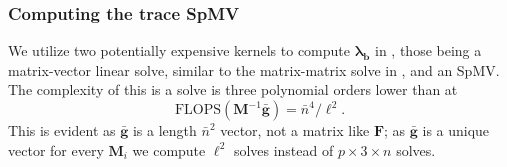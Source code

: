 
%		



%
%
%
\subsubsection{Computing the trace SpMV}

%
%
%
We utilize two potentially expensive kernels to compute $\symbf{\lambda}_{\textbf{b}}$ in , those being a matrix-vector linear solve, similar to the matrix-matrix solve in , and an SpMV. 
The complexity of this is a solve is three polynomial orders lower than  at
\begin{equation}
	\text{FLOPS}(\textbf{M}^{-1}\bar{\textbf{g}}) = \bar{n}^4/\ell^2.
\end{equation}
\noindent
This is evident as $\bar{\textbf{g}}$ is a length $\bar{n}^2$ vector, not a matrix like $\textbf{F}$; as $\bar{\textbf{g}}$ is a unique vector for every $\textbf{M}_i$ we compute $\ell^2$ solves instead of $p \times 3 \times n$ solves.

